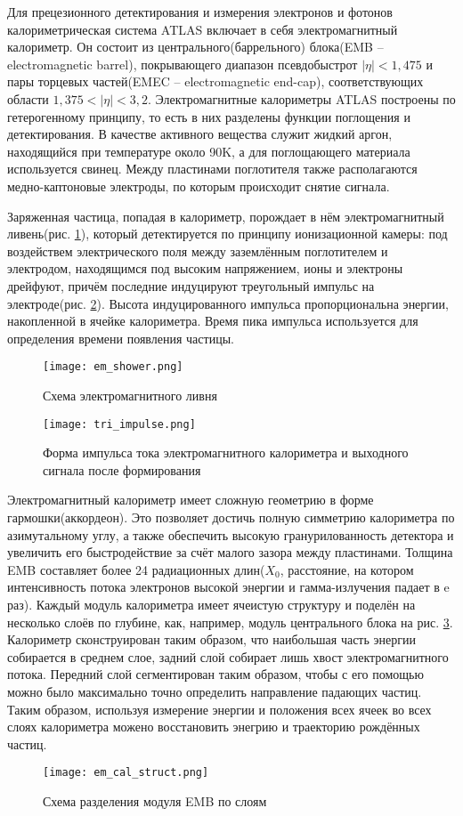 Для прецезионного детектирования и измерения электронов и фотонов калориметрическая система ATLAS включает в себя электромагнитный калориметр. Он состоит из центрального(баррельного) блока(EMB -- electromagnetic barrel), покрывающего диапазон псевдобыстрот $|\eta| < 1,475$ и пары торцевых частей(EMEC -- electromagnetic end-cap), соответствующих области $1,375 < |\eta| < 3,2$. Электромагнитные калориметры ATLAS построены по гетерогенному принципу, то есть в них разделены функции поглощения и детектирования. В качестве активного вещества служит жидкий аргон, находящийся при температуре около 90K, а для поглощающего материала используется свинец. Между пластинами поглотителя также располагаются медно-каптоновые электроды, по которым происходит снятие сигнала.\par
Заряженная частица, попадая в калориметр, порождает в нём электромагнитный ливень(рис. \ref{fig:em_shower})\parencite{em_shower_wiki}, который детектируется по принципу ионизационной камеры: под воздействем электрического поля между заземлённым поглотителем и электродом, находящимся под высоким напряжением, ионы и электроны дрейфуют, причём последние индуцируют треугольный импульс на электроде(рис. \ref{fig:tri_impulse}). Высота индуцированного импульса пропорциональна энергии, накопленной в ячейке калориметра. Время пика импульса используется для определения времени появления частицы.\par
\begin{figure}[ht]
    \centering
    \texttt{[image: em\_shower.png]}
    \caption{Схема электромагнитного ливня}
    \label{fig:em_shower}
\end{figure}
\begin{figure}[ht]
    \centering
    \texttt{[image: tri\_impulse.png]}
    \caption{Форма импульса тока электромагнитного калориметра и выходного сигнала после формирования}
    \label{fig:tri_impulse}
\end{figure}
Электромагнитный калориметр имеет сложную геометрию в форме гармошки(аккордеон). Это позволяет достичь полную симметрию калориметра по азимутальному углу, а также обеспечить высокую гранурилованность детектора и увеличить его быстродействие за счёт малого зазора между пластинами. Толщина EMB составляет более 24 радиационных длин($X_0$, расстояние, на котором интенсивность потока электронов высокой энергии и гамма-излучения падает в e раз). Каждый модуль калориметра имеет ячеистую структуру и поделён на несколько слоёв по глубине, как, например, модуль центрального блока на рис. \ref{fig:em_cal_struct}. Калориметр сконструирован таким образом, что наибольшая часть энергии собирается в среднем слое, задний слой собирает лишь хвост электромагнитного потока. Передний слой сегментирован таким образом, чтобы с его помощью можно было максимально точно определить направление падающих частиц. Таким образом, используя измерение энергии и положения всех ячеек во всех слоях калориметра можено восстановить энегрию и траекторию рождённых частиц.
\begin{figure}[ht]
    \centering
    \texttt{[image: em\_cal\_struct.png]}
    \caption{Схема разделения модуля EMB по слоям}
    \label{fig:em_cal_struct}
\end{figure}
